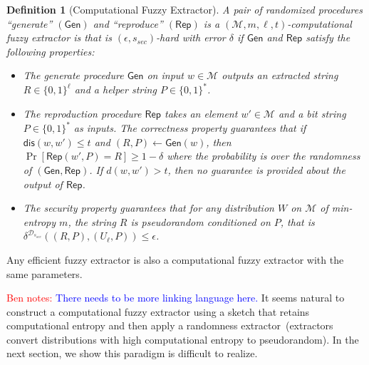 \documentclass[11pt]{article}
\newcommand{\secref}[1]{\mbox{Section~\ref{#1}}}
\newcommand{\class}[1]{{\ensuremath{\mathsf{#1}}}}
\newcommand{\gen}{\ensuremath{\class{Gen}}\xspace}
\newcommand{\rep}{\ensuremath{\class{Rep}}\xspace}
\newcommand{\rec}{\ensuremath{\class{Rec}}\xspace}
\newcommand{\dis}{\ensuremath{\mathsf{dis}}}
\newtheorem{definition}[theorem]{Definition}
\newcommand{\authnote}[2]{{\textcolor{red}{\textsf{#1 notes: }\textcolor{blue}{ #2}}\marginpar{\textcolor{red}{\textbf{!!!!!}}}}}
\newcommand{\authnote}[2]{}
\newcommand{\bnote}[1]{{\authnote{Ben}{#1}}}
\begin{document}
\begin{definition}[Computational Fuzzy Extractor]\label{def:comp fuzzy extractor}
A pair of randomized procedures ``generate'' $(\gen)$ and ``reproduce'' $(\rep)$ is a $(\mathcal{M}, m, \ell, t)$-\emph{computational fuzzy extractor} is that is $(\epsilon, s_{sec})$-hard with error $\delta$ if \gen and \rep satisfy the following properties:
\begin{itemize}
\item The generate procedure \gen on input $w\in \mathcal{M}$ outputs an extracted string $R\in\{0,1\}^\ell$ and a helper string $P\in\{0,1\}^*$.
\item The reproduction procedure \rep takes an element $w'\in\mathcal{M}$ and a bit string $P\in\{0,1\}^*$ as inputs.  The \emph{correctness} property guarantees that if $\dis(w, w')\leq t$ and $(R, P)\leftarrow \gen(w)$, then $\Pr[\rep( w', P) = R] \geq 1-\delta$ where the probability is over the randomness of $(\gen, \rep)$.  %
If $d(w, w') > t$, then no guarantee is provided about the output of \rep.
\item The \emph{security} property guarantees that for any distribution $W$ on $\mathcal{M}$ of min-entropy $m$, the string $R$ is pseudorandom conditioned on $P$, that is $\delta^{\mathcal{D}_{s_{sec}}}((R, P), (U_\ell, P))\leq \epsilon$.
\end{itemize}
\end{definition}
Any efficient fuzzy extractor is also a computational fuzzy extractor with the same parameters.%

\bnote{There needs to be more linking language here.}
It seems natural to construct a computational fuzzy extractor using a sketch that retains computational entropy and then apply a randomness extractor~(extractors convert distributions with high computational entropy to pseudorandom).  In the next section, we show this paradigm is difficult to realize. 

\end{document}
